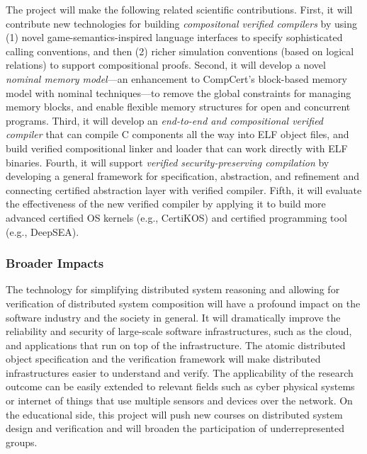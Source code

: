 The project will make the following related scientific
contributions. First, it will contribute new technologies for building
{\em compositonal verified compilers} by using (1) novel
game-semantics-inspired language interfaces to specify sophisticated
calling conventions, and then (2) richer simulation conventions (based
on logical relations) to support compositional proofs.  Second, it
will develop a novel {\em nominal memory model}---an enhancement to
CompCert's block-based memory model with nominal techniques---to
remove the global constraints for managing memory blocks, and enable
flexible memory structures for open and concurrent programs. Third, it
will develop an {\em end-to-end and compositional verified compiler}
that can compile C components all the way into ELF object files, and
build verified compositional linker and loader that can work directly
with ELF binaries.  Fourth, it will support {\em verified
security-preserving compilation} by developing a general framework for
specification, abstraction, and refinement and connecting certified
abstraction layer with verified compiler. Fifth, it will evaluate the
effectiveness of the new verified compiler by applying it to build
more advanced certified OS kernels (e.g., CertiKOS) and certified
programming tool (e.g., DeepSEA).

\subsubsection*{Broader Impacts} 

The technology for simplifying distributed system reasoning and
allowing for verification of distributed system composition will have
a profound impact on the software industry and the society in
general. It will dramatically improve the reliability and security of
large-scale software infrastructures, such as the cloud, and
applications that run on top of the infrastructure.  The atomic
distributed object specification and the verification framework will
make distributed infrastructures easier to understand and verify.  The
applicability of the research outcome can be easily extended to
relevant fields such as cyber physical systems or internet of things
that use multiple sensors and devices over the network.  On the
educational side, this project will push new courses on distributed
system design and verification and will broaden the participation of
underrepresented groups.

